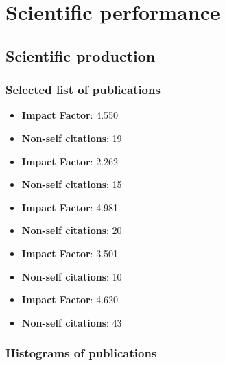 \section{Scientific performance} \label{sec:sci-performance}

\subsection{Scientific production}

\subsubsection{Selected list of publications}

\autocite{Lamurias2015} 
\begin{itemize}
    \item \textbf{Impact Factor}: 4.550
    \item \textbf{Non-self citations}: 19
\end{itemize}

\autocite{Pesquita2014} 
\begin{itemize}
    \item \textbf{Impact Factor}: 2.262
    \item \textbf{Non-self citations}: 15
\end{itemize}

\autocite{Ferreira2013} 
\begin{itemize}
    \item \textbf{Impact Factor}: 4.981
    \item \textbf{Non-self citations}: 20
\end{itemize}

\autocite{Ferreira2012a} 
\begin{itemize}
    \item \textbf{Impact Factor}: 3.501
    \item \textbf{Non-self citations}: 10
\end{itemize}

\autocite{Ferreira2010} 
\begin{itemize}
    \item \textbf{Impact Factor}: 4.620
    \item \textbf{Non-self citations}: 43
\end{itemize}


\subsubsection{Histograms of publications}

